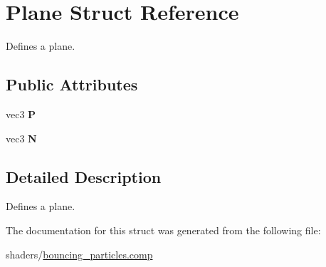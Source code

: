 \hypertarget{struct_plane}{}\section{Plane Struct Reference}
\label{struct_plane}


Defines a plane.  


\subsection*{Public Attributes}
\begin{DoxyCompactItemize}
\item 
\mbox{\label{struct_plane_a0734239441787c5a4be7ebc2640a6fee}} 
vec3 {\bfseries P}
\item 
\mbox{\label{struct_plane_af2ac61ba99b757ded486d5f497b76534}} 
vec3 {\bfseries N}
\end{DoxyCompactItemize}


\subsection{Detailed Description}
Defines a plane. 

The documentation for this struct was generated from the following file\+:\begin{DoxyCompactItemize}
\item 
shaders/\hyperlink{bouncing__particles_8comp}{bouncing\+\_\+particles.\+comp}\end{DoxyCompactItemize}
